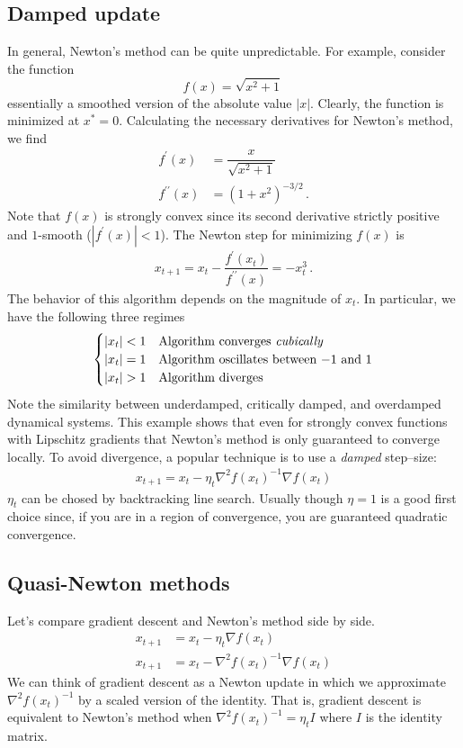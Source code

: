 \subsection{Damped update}
In general, Newton's method can be quite unpredictable.
For example, consider the function 
\[
f(x) = \sqrt{x^2 +1}\,
\] 
essentially a smoothed version of the absolute value $|x|$.
Clearly, the function is minimized at $x^* = 0$. 
Calculating the necessary derivatives for Newton's method, we find
\begin{align*}
    f^\prime (x) &= \dfrac{x}{\sqrt{x^2 + 1}}\, \\
    f^{\prime \prime} (x) &= (1+x^2)^{-3/2}\,.
\end{align*}
Note that $f(x)$ is strongly convex since its second derivative strictly positive 
and $1$-smooth ($|f^\prime (x)| < 1$). 
The Newton step for minimizing $f(x)$ is
\begin{align*}
    x_{t+1} = x_t - \dfrac{f^\prime (x_t)}{f^{\prime \prime}(x)} = -x_t^3\,.
\end{align*}
The behavior of this algorithm depends on the magnitude of $x_t$. 
In particular, we have the following three regimes
\[ \begin{cases} 
      |x_t| < 1 & \text{Algorithm converges \textit{cubically}}\\
      |x_t| = 1 & \text{Algorithm oscillates between $-1$ and $1$} \\
      |x_t| > 1 & \text{Algorithm diverges} 
   \end{cases}
\]
Note the similarity between underdamped, critically damped, and overdamped dynamical systems. This example shows that even for strongly convex functions with Lipschitz gradients that Newton's method is only guaranteed to converge locally. To avoid divergence, a popular technique is to use a \textit{damped} step--size:
\begin{align*}
    x_{t+1} = x_t - \eta_t \nabla^2 f(x_t)^{-1} \nabla f(x_t)
\end{align*}
$\eta_t$ can be chosed by backtracking line search. Usually though $\eta = 1$ is a good first choice since, if you are in a region of convergence, you are guaranteed quadratic convergence.

\subsection{Quasi-Newton methods}
Let's compare gradient descent and Newton's method side by side.
    \begin{align*}
        x_{t+1} &= x_t - \eta_t \nabla f(x_t) \tag{Gradient descent}\\
        x_{t+1} &= x_t - \nabla^2 f(x_t)^{-1} \nabla f(x_t) \tag{Newton's method}
    \end{align*}
We can think of gradient descent as a Newton update in which we approximate
$\nabla^2 f(x_t)^{-1}$ by a scaled version of the identity. 
That is, gradient descent is equivalent to Newton's method when $\nabla^2
f(x_t)^{-1} = \eta_t I$ where $I$ is the identity matrix. 

